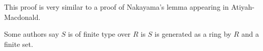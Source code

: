 This proof is very similar to a proof of Nakayama's lemma appearing in
Atiyah-Macdonald.

Some authors say $S$ is of finite type over $R$ is $S$ is generated as a ring by $R$
and a finite set.
